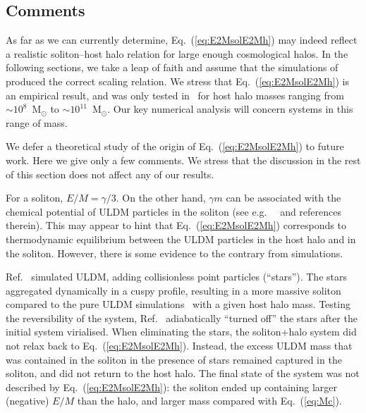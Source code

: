 \documentclass[aps,prd,floats,superscriptaddress,showpacs,nofootinbib,twocolumn,preprintnumbers]{revtex4-1}%
\begin{document}
\subsection{Comments}\label{ss:disc}
%
As far as we can currently determine, Eq.~(\ref{eq:E2MsolE2Mh}) may
indeed reflect a realistic soliton--host halo relation for large
enough cosmological halos.  
In the following sections, we take a leap of faith and assume that the
simulations of~\cite{Schive:2014hza,Schive:2014dra} produced the
correct scaling relation.  
%
We stress that Eq.~(\ref{eq:E2MsolE2Mh}) is an empirical result, and
was only tested in~\cite{Schive:2014hza,Schive:2014dra} for host halo
masses ranging from $\sim10^8$~M$_\odot$ to
$\sim10^{11}$~M$_\odot$. Our key numerical analysis will concern
systems in this range of mass.  

We defer a theoretical study of the origin of
Eq.~(\ref{eq:E2MsolE2Mh}) to future work. Here
we give only a few comments. We stress that the discussion in the rest of this section does not affect any of our results. 

For a soliton, $E/M=\gamma/3$. On the other hand, $\gamma m$ can be
associated with the chemical potential of ULDM particles in the
soliton (see e.g.~~\cite{Eby:2017zyx} and references therein). This may appear to 
hint that Eq.~(\ref{eq:E2MsolE2Mh}) corresponds to 
thermodynamic equilibrium between the ULDM particles in the host halo
and in the soliton. However, there is some evidence to the contrary
from simulations.

Ref.~\cite{2017arXiv171201947C} simulated ULDM, adding collisionless point particles (``stars''). 
The stars aggregated dynamically in a cuspy profile,
resulting in a more massive soliton compared to the pure ULDM
simulations~\cite{Schive:2014hza,Schive:2014dra} with a given host
halo mass.  
Testing the reversibility of the system,
Ref.~\cite{2017arXiv171201947C} adiabatically ``turned off'' the stars
after the initial system virialised. When eliminating the stars, the
soliton+halo system did not relax back to
Eq.~(\ref{eq:E2MsolE2Mh}). Instead, the excess ULDM mass that was
contained in the soliton in the presence of stars remained captured in
the soliton, and did not return to the host halo. 
The final state of the system was not described by
Eq.~(\ref{eq:E2MsolE2Mh}): the soliton ended up containing larger
(negative) $E/M$ than the halo, and larger mass compared with
Eq.~(\ref{eq:Mc}). 
\end{document}
